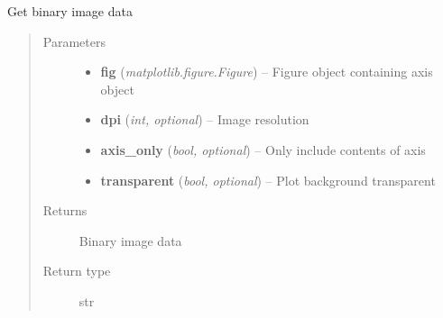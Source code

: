 \documentclass[letterpaper,10pt,english]{sphinxmanual}
\begin{document}
\begin{fulllineitems}
\label{flamingo/segmentation/index:flamingo.segmentation.plot.get_image_data}
Get binary image data
\begin{quote}\begin{description}
\item[{Parameters}] \leavevmode\begin{itemize}
\item {} 
\textbf{fig} (\emph{matplotlib.figure.Figure}) -- Figure object containing axis object

\item {} 
\textbf{dpi} (\emph{int, optional}) -- Image resolution

\item {} 
\textbf{axis\_only} (\emph{bool, optional}) -- Only include contents of axis

\item {} 
\textbf{transparent} (\emph{bool, optional}) -- Plot background transparent

\end{itemize}

\item[{Returns}] \leavevmode
Binary image data

\item[{Return type}] \leavevmode
str

\end{description}\end{quote}

\end{fulllineitems}

\end{document}
